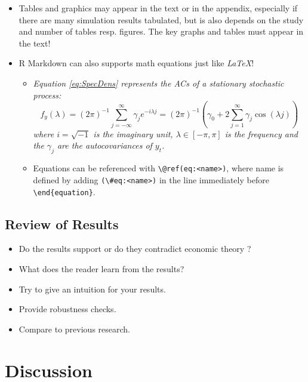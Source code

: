 \documentclass[11pt, a4paper, twosided]{book}
\begin{document}
\begin{itemize}
\item
  Tables and graphics may appear in the text or in the appendix, especially if
  there are many simulation results tabulated, but is also depends on the study
  and number of tables resp. figures. The key graphs and tables must appear in
  the text!
\item
  R Markdown can also supports math equations just like \emph{LaTeX}!
  \begin{itemize}
  \item
    \emph{Equation \eqref{eq:SpecDens} represents the ACs of a stationary
    stochastic process:}
    \begin{equation}
            f_y(\lambda) = (2\pi)^{-1} \sum_{j=-\infty}^{\infty}
                           \gamma_j e^{-i\lambda j}
                         =(2\pi)^{-1}\left(\gamma_0 + 2 \sum_{j=1}^{\infty}
        \gamma_j \cos(\lambda j)\right)
                                       \label{eq:SpecDens}
    \end{equation}
    \emph{where \(i=\sqrt{-1}\) is the imaginary unit, \(\lambda \in [-\pi, \pi]\) is the
    frequency and the \(\gamma_j\) are the autocovariances of \(y_t\).}
  \item
    Equations can be referenced with \texttt{\textbackslash{}@ref(eq:\textless{}name\textgreater{})}, where name is defined
    by adding \texttt{(\textbackslash{}\#eq:\textless{}name\textgreater{})} in the line immediately before \texttt{\textbackslash{}end\{equation\}}.
  \end{itemize}
\end{itemize}
\hypertarget{review-of-results}{%
\section{Review of Results}\label{review-of-results}}
\begin{itemize}
\item
  Do the results support or do they contradict economic theory ?
\item
  What does the reader learn from the results?
\item
  Try to give an intuition for your results.
\item
  Provide robustness checks.
\item
  Compare to previous research.
\end{itemize}
\hypertarget{discussion-2}{%
\chapter{Discussion}\label{discussion-2}}
\end{document}
